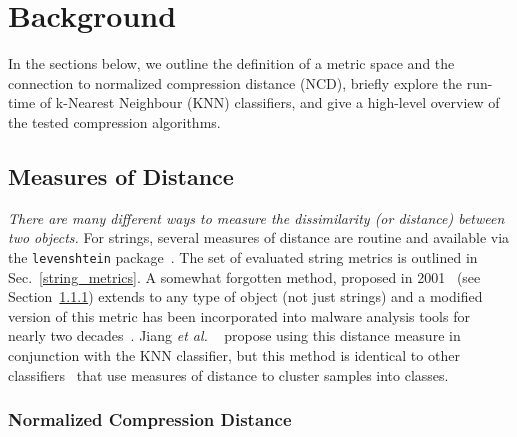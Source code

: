 \documentclass[conference]{IEEEtran}
\newcommand{\cm}[1]{\textit{{\color{blue}#1}}}
\begin{document}
\section{Background}

In the sections below, we outline the definition of a metric space and the connection to normalized compression distance (NCD), briefly explore the run-time of k-Nearest Neighbour (KNN) classifiers, and give a high-level overview of the tested compression algorithms.



\subsection{Measures of Distance}

\cm{There are many different ways to measure the dissimilarity (or distance) between two objects.}
For strings, several measures of distance are routine and available via the \texttt{levenshtein} package~\cite{levenshtein}. 
The set of evaluated string metrics is outlined in Sec.~\ref{string_metrics}. 
A somewhat forgotten method, proposed in 2001~\cite{ncd} (see Section~\ref{ncd}) extends to any type of object (not just strings) and a modified version of this metric has been incorporated into malware analysis tools for nearly two decades~\cite{}. 
Jiang \textit{et al.} ~\cite{jiang2022less} propose using this distance measure in conjunction with the KNN classifier, but this method is identical to other classifiers~\cite{vapnik1994measuring} that use measures of distance to cluster samples into classes. 



\subsubsection{Normalized Compression Distance}
\label{ncd}
\end{document}
